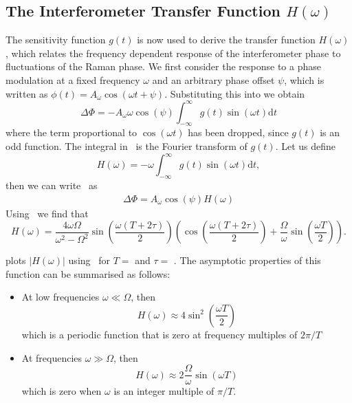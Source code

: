 \subsection{The Interferometer Transfer Function $H(\omega)$}\label{subsec:laser_phase}
The sensitivity function $g(t)$ is now used to derive the transfer
function $H(\omega)$, which relates the frequency dependent response of the interferometer phase to
fluctuations of the Raman phase. We first consider the response to a phase modulation at a
fixed frequency $\omega$ and an arbitrary phase offset $\psi$, which
is written as
\(\phi(t) = A_\omega\cos(\omega t + \psi)\). Substituting this into
 we obtain
\begin{equation}
  \Delta\Phi = - A_\omega \omega \cos(\psi) \int_{-\infty}^\infty g(t) \sin(\omega
  t) \mathrm{d} t
  \label{eq:phase_fourier}
\end{equation}
where the term proportional to \(\cos(\omega t)\) has been dropped,
since \(g(t)\) is an odd function. The integral
in~ is the Fourier
transform of \(g(t)\). Let us define
\begin{equation}
  H(\omega) = -\omega \int_{-\infty}^{\infty} g(t) \sin(\omega t)
  \mathrm{d} t,
  \label{eq:sensitvity_fourier}
\end{equation}
then we can write~ as
\begin{align}
  \Delta\Phi = A_\omega \cos(\psi) H(\omega)
  \label{eq:interfometer_fourier}
\end{align}
Using~
we find that~\nocite{Canuel2007}
\begin{equation}
  H(\omega) = \frac{4 \omega
  \Omega}{\omega^2-\Omega^2}\sin\left(\frac{\omega(T+2\tau)}{2}\right)\left(\cos\left(\frac{\omega(T+2\tau)}{2}\right)
  + \frac{\Omega}{\omega}\sin \left(\frac{\omega T}{2}\right)\right).
  \label{eq:sens_fourier_full}
\end{equation}
\par\noindent
{} plots $|H(\omega)|$
using~ for
\(T= \)  and \(\tau
= \) . 
The asymptotic properties of this
function can be summarised as follows:
\begin{itemize}
  \item At low frequencies \(\omega \ll \Omega\), then 
    \begin{equation}
      H(\omega) \approx 4 \sin^2 \left(\frac{\omega T}{2}\right)
    \end{equation}
    which is a periodic function that is zero at frequency multiples
    of \(2\pi/T\) \\
  \item At frequencies \(\omega \gg \Omega\), then
    \begin{equation}
      H(\omega) \approx 2 \frac{\Omega}{\omega}\sin
      \left(\omega T\right)
    \end{equation}
    which is zero when $\omega$ is an integer multiple of $\pi/T$.
\end{itemize}
